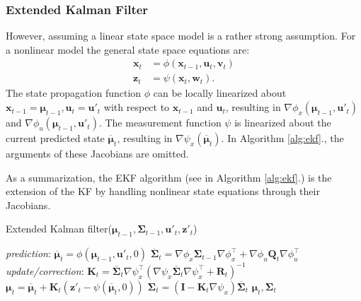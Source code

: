 \subsubsection{Extended Kalman Filter}
However, assuming a linear state space model is a rather strong assumption. For a nonlinear model the general state space equations are:
\begin{align}
  \mathbf{x}_t & = \phi(\mathbf{x}_{t-1},\mathbf{u}_t,\mathbf{v}_t) \label{eq:explicit-mot-eq} \\
  \mathbf{z}_t & = \psi(\mathbf{x}_t,\mathbf{w}_t).  \label{eq:explicit-meas-eq}
\end{align}
The state propagation function $\phi$ can be locally linearized about $\mathbf{x}_{t-1} = \boldsymbol{\mu}_{t-1}, \mathbf{u}_t = \mathbf{u}'_t$ with respect to $\mathbf{x}_{t-1}$ and $\mathbf{u}_t$, resulting in $\nabla \phi _x(\boldsymbol{\mu}_{t-1},\mathbf{u}'_t)$ and $\nabla \phi_u(\boldsymbol{\mu}_{t-1},\mathbf{u}'_t)$.
The measurement function $\psi$ is linearized about the current predicted state $\overline{\boldsymbol{\mu}}_t$,
resulting in $\nabla \psi_x(\overline{\boldsymbol{\mu}}_t)$.
In Algorithm \ref{alg:ekf}., the arguments of these Jacobians are omitted.

As a summarization, the EKF algorithm (see in Algorithm \ref{alg:ekf}.) is the extension of the KF by handling nonlinear state equations through their Jacobians.

\begin{algorithm}
  \caption{Extended Kalman filter($\boldsymbol{\mu}_{t-1},\mathbf{\Sigma}_{t-1},\mathbf{u}'_t,\mathbf{z}'_t$)}\label{alg:ekf}
  \begin{algorithmic}[1]
    \BState \emph{prediction}:
    \State\indent$\overline{\boldsymbol{\mu}}_t = \phi(\boldsymbol{\mu}_{t-1},\mathbf{u}'_t,0)$
    \State\indent $\overline{\mathbf{\Sigma}}_t = \nabla \phi_x\mathbf{\Sigma}_{t-1}\nabla \phi_x^{\top} +
      \nabla \phi _u\mathbf{Q}_t \nabla \phi_u^{\top}$
    \BState \emph{update/correction}:
    \State\indent $\mathbf{K}_t = \overline{\mathbf{\Sigma}}_t\nabla \psi_x^\top\left(\nabla \psi_x\overline{\mathbf{\Sigma}}_t\nabla \psi_x^\top+\mathbf{R}_t\right)^{-1}$ \label{alg:line:kalman-gain}
    \State\indent $\boldsymbol{\mu}_t = \overline{\boldsymbol{\mu}}_t + \mathbf{K}_t\left(\mathbf{z}'_t-\psi(\overline{\boldsymbol{\mu}}_t,0)\right)$ \label{alg:line:state-update}
    \State\indent $\mathbf{\Sigma}_t = \left(\mathbf{I}-\mathbf{K}_t\nabla \psi_x\right)\overline{\mathbf{\Sigma}}_t$
    \State\Return $\boldsymbol{\mu}_t,\mathbf{\Sigma}_t$
  \end{algorithmic}
\end{algorithm}

